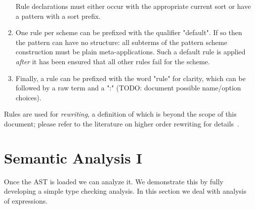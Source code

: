 \documentclass[11pt]{article} %
\begin{document}
\begin{manual}
\begin{enumerate}
    Rule declarations must either occur with the appropriate current sort or have a pattern with a
    sort prefix.

  \item One rule per scheme can be prefixed with the qualifier "default". If so then the pattern can
    have no structure: all subterms of the pattern scheme construction must be plain
    meta-applications. Such a default rule is applied \emph{after} it has been ensured that all
    other rules fail for the scheme.

  \item Finally, a rule can be prefixed with the word "rule" for clarity, which can be followed by a
    raw term and a ":" (TODO: document possible name/option choices).

  \end{enumerate}
  Rules are used for \emph{rewriting}, a definition of which is beyond the scope of this document;
  please refer to the literature on higher order rewriting for details~\cite{Klop+:tcs1993}.
\end{manual}


\section{Semantic Analysis I}
\label{sec:analysis}

Once the AST is loaded we can analyze it.  We demonstrate this by fully developing a simple type
checking analysis.  In this section we deal with analysis of expressions. 
\end{document}

